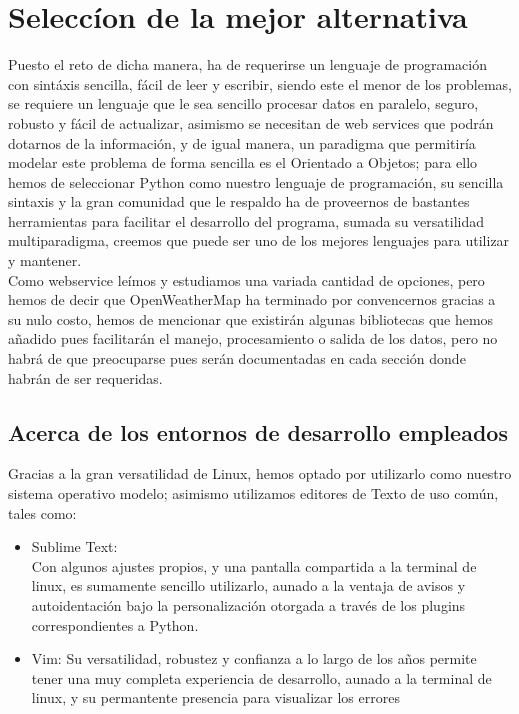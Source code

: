 \documentclass{article}
\begin{document}
\section{Seleccíon de la mejor alternativa}
Puesto el reto de dicha manera, ha de requerirse un lenguaje de programación con sintáxis sencilla, fácil de leer y escribir, siendo este el menor de los problemas, se requiere un lenguaje que le sea sencillo procesar datos en paralelo, seguro, robusto y fácil de actualizar, asimismo se necesitan de web services que podrán dotarnos de la información, y de igual manera, un paradigma que permitiría modelar este problema de forma sencilla es el Orientado a Objetos;
para ello hemos de seleccionar Python como nuestro lenguaje de programación, su sencilla sintaxis y la gran comunidad que le respaldo ha de proveernos de bastantes herramientas para facilitar el desarrollo del programa, sumada su versatilidad multiparadigma, creemos que puede ser uno de los mejores lenguajes para utilizar y mantener.\\
Como webservice leímos y estudiamos una variada cantidad de opciones, pero hemos de decir que OpenWeatherMap ha terminado por convencernos gracias a su nulo costo, hemos de mencionar que existirán algunas bibliotecas que hemos añadido pues facilitarán el manejo, procesamiento o salida de los datos, pero no habrá de que preocuparse pues serán documentadas en cada sección donde habrán de ser requeridas.
\subsection{ Acerca de los entornos de desarrollo empleados}
        Gracias a la gran versatilidad de Linux, hemos optado por utilizarlo como nuestro sistema operativo modelo; asimismo
        utilizamos editores de Texto de uso común, tales como:\\
        \begin{itemize}
            \item Sublime Text:\\
            Con algunos ajustes propios, y una pantalla compartida a la terminal de linux, es sumamente sencillo utilizarlo, aunado a la ventaja de avisos y autoidentación bajo la personalización otorgada a través de los plugins correspondientes a Python.
            \item Vim:
            Su versatilidad, robustez y confianza a lo largo de los años permite tener una muy completa experiencia de desarrollo, aunado a la terminal de linux, y su permantente presencia para visualizar los errores
            
        \end{itemize}
        
\end{document}
